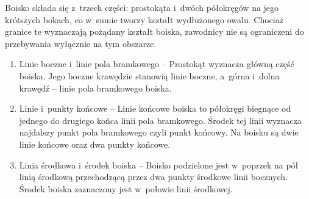 \documentclass[12pt,a4paper]{article}
\renewcommand{\subsubsection}[1]{
  \oldsubsubsection{#1}%
  \leftskip1.5cm
}
\begin{document}
\subsubsection{Kształt boiska}
Boisko składa się z~trzech części: prostokąta i~dwóch półokręgów na jego
krótszych bokach, co w~sumie tworzy kształt wydłużonego owalu. Chociaż
granice te wyznaczają pożądany kształt boiska, zawodnicy nie są
ograniczeni do przebywania wyłącznie na tym obszarze.
\begin{enumerate}
	\item{Linie boczne i~linie pola bramkowego} -- Prostokąt wyznacza
	      główną część boiska. Jego boczne krawędzie stanowią linie boczne, a~górna i~dolna krawędź -- linie pola bramkowego boiska.

	\item{Linie i~punkty końcowe} -- Linie końcowe boiska to
	      półokręgi biegnące od jednego do drugiego końca linii pola bramkowego.
	      Środek tej linii wyznacza najdalszy punkt pola bramkowego czyli punkt końcowy. Na boisku są dwie linie końcowe oraz dwa punkty końcowe.

	\item{Linia środkowa i~środek boiska} -- Boisko podzielone
	      jest w~poprzek na pół linią środkową przechodzącą przez dwa punkty środkowe linii bocznych. Środek boiska zaznaczony jest w~połowie linii środkowej.
\end{enumerate}
\end{document}
